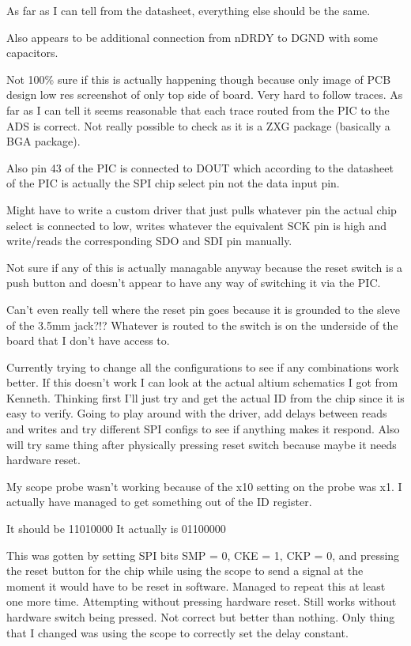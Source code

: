 As far as I can tell from the datasheet, everything else should be the same.

Also appears to be additional connection from nDRDY to DGND with some capacitors.

Not 100\% sure if this is actually happening though because only image of PCB design
low res screenshot of only top side of board. Very hard to follow traces.
As far as I can tell it seems reasonable that each trace routed from the PIC to the ADS
is correct. Not really possible to check as it is a ZXG package (basically a BGA package).

Also pin 43 of the PIC is connected to DOUT which according to the datasheet of the PIC
is actually the SPI chip select pin not the data input pin.

Might have to write a custom driver that just pulls whatever pin the actual chip select
is connected to low, writes whatever the equivalent SCK pin is high and write/reads
the corresponding SDO and SDI pin manually.

Not sure if any of this is actually managable anyway because the reset switch
is a push button and doesn't appear to have any way of switching it via the PIC.

Can't even really tell where the reset pin goes because it is grounded to the sleve of
the 3.5mm jack?!? Whatever is routed to the switch is on the underside of the board
that I don't have access to.

Currently trying to change all the configurations to see if any combinations work better.
If this doesn't work I can look at the actual altium schematics I got from Kenneth.
Thinking first I'll just try and get the actual ID from the chip
since it is easy to verify.
Going to play around with the driver, add delays between reads and writes and try different
SPI configs to see if anything makes it respond.
Also will try same thing after physically pressing reset switch because maybe it needs
hardware reset.

My scope probe wasn't working because of the x10 setting on the probe was x1.
I actually have managed to get something out of the ID register.

It should be    11010000
It actually is  01100000

This was gotten by setting SPI bits SMP = 0, CKE = 1, CKP = 0, and pressing
the reset button for the chip while using the scope to send a signal at the moment it
would have to be reset in software.
Managed to repeat this at least one more time. Attempting without pressing hardware reset.
Still works without hardware switch being pressed. Not correct but better than nothing.
Only thing that I changed was using the scope to correctly set the delay constant.

